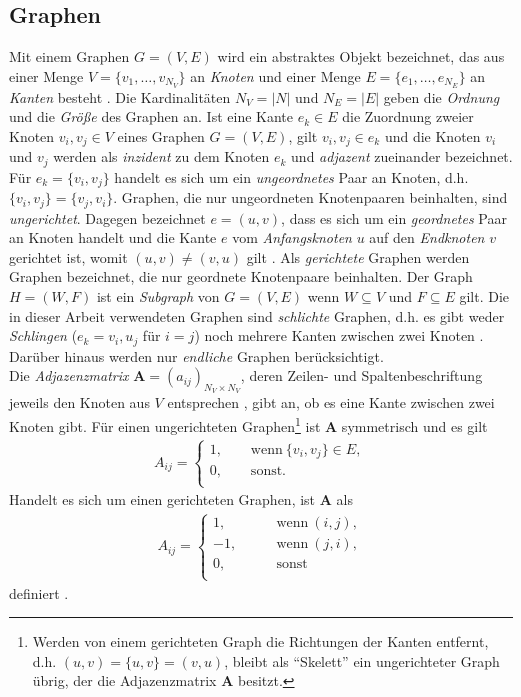 \documentclass[12pt, a4paper]{report}
\begin{document}
\subsection{Graphen}
Mit einem Graphen $G=(V,E)$ wird ein abstraktes Objekt bezeichnet, das aus einer Menge $V=\{v_1,\dots,v_{N_V}\}$ an \textit{Knoten} und einer Menge $E=\{e_1,\dots,e_{N_E}\}$ an \textit{Kanten} besteht \cite{brandes2005graphfunda}. Die Kardinalitäten $N_V =|N|$ und $N_E=|E|$ geben die \textit{Ordnung} und die \textit{Größe} des Graphen an. Ist eine Kante $e_k \in E$ die Zuordnung zweier Knoten $v_i,v_j \in V$ eines Graphen $G=(V,E)$, gilt ${v_i,v_j} \in e_k$ und die Knoten $v_i$ und $v_j$ werden als \textit{inzident} zu dem Knoten $e_k$ und \textit{adjazent} zueinander bezeichnet. Für $e_k=\{v_i,v_j\}$ handelt es sich um ein \textit{ungeordnetes} Paar an Knoten, d.h. $\{v_i,v_j\}=\{v_j,v_i\}$. Graphen, die nur ungeordneten Knotenpaaren beinhalten, sind \textit{ungerichtet}. Dagegen bezeichnet $e=(u,v)$, dass es sich um ein \textit{geordnetes} Paar an Knoten handelt und die Kante $e$ vom \textit{Anfangsknoten} $u$ auf den \textit{Endknoten} $v$ gerichtet ist, womit $(u,v) \neq (v, u)$ gilt \cite{kolaczyk2009statistical}. Als \textit{gerichtete} Graphen werden Graphen bezeichnet, die nur geordnete Knotenpaare beinhalten. Der Graph $H=(W,F)$ ist ein \textit{Subgraph} von $G=(V,E)$ wenn $W \subseteq V$ und $F \subseteq E$ gilt. Die in dieser Arbeit verwendeten Graphen sind \textit{schlichte} Graphen, d.h. es gibt weder \textit{Schlingen} ($e_k={v_i,u_j}$ für $i=j$) noch mehrere Kanten zwischen zwei Knoten \cite{tittmann2011graphen}. Darüber hinaus werden nur \textit{endliche} Graphen berücksichtigt.\\
Die \textit{Adjazenzmatrix} $\textbf{A}=(a_{ij})_{N_V \times N_V}$, deren Zeilen- und Spaltenbeschriftung jeweils den Knoten aus $V$ entsprechen \cite{kolaczyk2009statistical}, gibt an, ob es eine Kante zwischen zwei Knoten gibt. Für einen ungerichteten Graphen\footnote{Werden von einem gerichteten Graph die Richtungen der Kanten entfernt, d.h. $(u,v)=\{u,v\}=(v,u)$, bleibt als "`Skelett"' ein ungerichteter Graph übrig, der die Adjazenzmatrix $\textbf{A}$ besitzt.} ist $\textbf{A}$ symmetrisch und es gilt 
\begin{align*}
A_{ij} = \begin{cases}
1, \qquad \text{wenn} \ \{v_i,v_j\} \in E,\\
0, \qquad \text{sonst.}\\
\end{cases}
\end{align*}
Handelt es sich um einen gerichteten Graphen, ist $\textbf{A}$ als
\begin{align*}
A_{ij} = \begin{cases}
1, \qquad &\text{wenn} \ (i,j),\\
-1, \qquad &\text{wenn} \ (j,i),\\
0, \qquad &\text{sonst}\\
\end{cases}
\end{align*}
definiert \cite{brandes2005graphfunda}.
\end{document}
